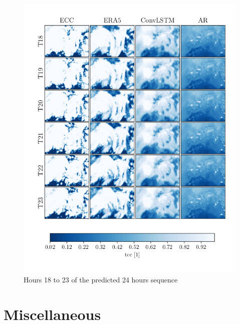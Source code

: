 \begin{figure}
    \centering
    \includegraphics{python_figs/comparing_seq_part_4_of4_jan2.png}
    \caption{Hours 18 to 23 of the  predicted 24 hours sequence }
    \label{fig:part4/4}
\end{figure}

\cleardoublepage

\chapter{Miscellaneous} \label{app:misc}

